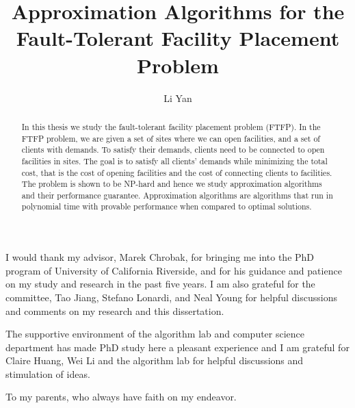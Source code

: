 \documentclass[oneside,final]{ucr}
\begin{document}

\title{Approximation Algorithms for the Fault-Tolerant Facility Placement Problem}
\author{Li Yan}

\maketitle
\copyrightpage{}
\approvalpage{}


\begin{frontmatter}

\begin{acknowledgements}
  I would thank my advisor, Marek Chrobak, for bringing me
  into the PhD program of University of California
  Riverside, and for his guidance and patience on my study
  and research in the past five years. I am also grateful
  for the committee, Tao Jiang, Stefano Lonardi, and Neal
  Young for helpful discussions and comments on my research
  and this dissertation.

  The supportive environment of the algorithm lab and
  computer science department has made PhD study here a
  pleasant experience and I am grateful for Claire Huang,
  Wei Li and the algorithm lab for helpful discussions and
  stimulation of ideas.
\end{acknowledgements}

\begin{dedication}
\null\vfil
{\large
\begin{center}
  To my parents, who always have faith on my endeavor.
\end{center}}
\vfil\null
\end{dedication}

\begin{abstract}
  In this thesis we study the fault-tolerant facility
  placement problem (FTFP). In the FTFP problem, we are
  given a set of sites where we can open facilities, and a
  set of clients with demands. To satisfy their demands,
  clients need to be connected to open facilities in
  sites. The goal is to satisfy all clients' demands while
  minimizing the total cost, that is the cost of opening
  facilities and the cost of connecting clients to
  facilities. The problem is shown to be NP-hard and hence
  we study approximation algorithms and their performance
  guarantee. Approximation algorithms are algorithms that
  run in polynomial time with provable performance when
  compared to optimal solutions.


\end{abstract}
\end{frontmatter}
\end{document}
